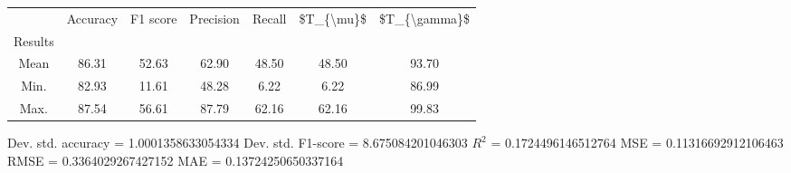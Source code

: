 \begin{tabular}{|c|c|c|c|c|c|c|}
\toprule
{} &  Accuracy &  F1 score &  Precision &  Recall &  \$T\_\{\textbackslash mu\}\$ &  \$T\_\{\textbackslash gamma\}\$ \\
Results &           &           &            &         &            &               \\
\hline
Mean    &     86.31 &     52.63 &      62.90 &   48.50 &      48.50 &         93.70 \\
Min.    &     82.93 &     11.61 &      48.28 &    6.22 &       6.22 &         86.99 \\
Max.    &     87.54 &     56.61 &      87.79 &   62.16 &      62.16 &         99.83 \\
\bottomrule
\end{tabular}

 Dev. std. accuracy = 1.0001358633054334
 Dev. std. F1-score = 8.675084201046303
 $R^2$ = 0.1724496146512764
 MSE = 0.11316692912106463
 RMSE = 0.3364029267427152
 MAE = 0.13724250650337164